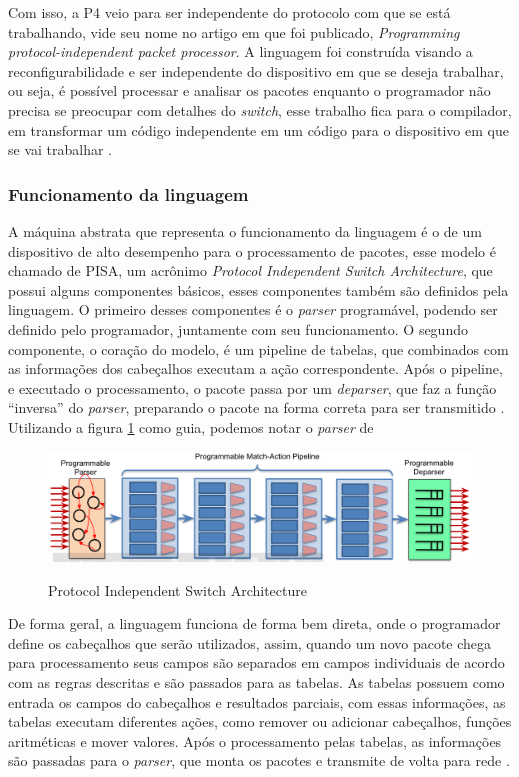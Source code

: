 \documentclass[
    12pt,
    openright, 
    oneside,
    a4paper,
    french,
    english,
    brazil
    ]{facom-ufu-abntex2}
\theoremstyle{definition}
\begin{document}
Com isso, a P4 veio para ser independente do protocolo com que se está trabalhando,
vide seu nome no artigo em que foi publicado, 
\emph{Programming protocol-independent packet processor}. A linguagem foi 
construída visando a reconfigurabilidade e ser independente do dispositivo em que se 
deseja trabalhar, ou seja, é possível processar e analisar os pacotes enquanto o programador
não precisa se preocupar com detalhes do \emph{switch}, esse trabalho fica para o compilador,
em transformar um código independente em um código para o dispositivo em que se vai 
trabalhar \cite{bosshart2014p4}.

\subsubsection{Funcionamento da linguagem}

A máquina abstrata que representa o funcionamento da linguagem é o de um dispositivo
de alto desempenho para o processamento de pacotes, esse modelo é chamado de PISA,
um acrônimo \emph{Protocol Independent Switch Architecture}, que possui alguns componentes
básicos, esses componentes também são definidos pela linguagem. O primeiro desses 
componentes é o \emph{parser} programável, podendo ser definido pelo programador, juntamente 
com seu funcionamento. O segundo componente, o coração do modelo, é um pipeline de tabelas,
que combinados com as informações dos cabeçalhos executam a ação correspondente. Após o pipeline, e executado
o processamento, o pacote passa por um \emph{deparser}, que faz a função ``inversa'' do \emph{parser}, 
preparando o pacote na forma correta para ser transmitido \cite{p4LangTutorial}.
Utilizando a figura \ref{fig:pisa-model} como guia, podemos notar o \emph{parser} de 


\begin{figure}[ht]
    \caption{Protocol Independent Switch Architecture \cite{paxos14spec}}
    \centering
    \includegraphics[width=\textwidth]{images/pisa.png}
    \label{fig:pisa-model}
\end{figure}

De forma geral, a linguagem funciona de forma bem direta, onde o programador define
os cabeçalhos que serão utilizados, assim, quando um novo pacote chega para processamento
seus campos são separados em campos individuais de acordo com as regras descritas e são
passados para as tabelas. As tabelas possuem como entrada os campos do cabeçalhos e 
resultados parciais, com essas informações, as tabelas executam diferentes ações,
como remover ou adicionar cabeçalhos, funções aritméticas e mover valores. Após o 
processamento pelas tabelas, as informações são passadas para o \emph{parser}, que 
monta os pacotes e transmite de volta para rede \cite{p4LangTutorial}.
\end{document}
